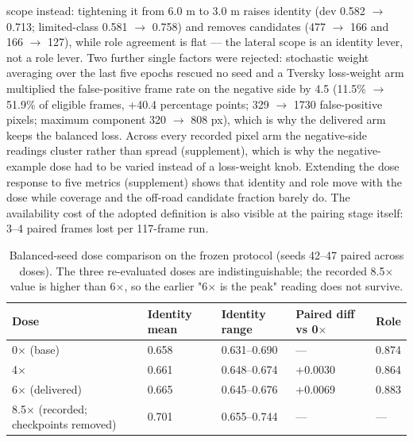 \documentclass[journal]{IEEEtran}
\begin{document}
scope instead: tightening it from 6.0 m to 3.0 m raises identity (dev 0.582 $\rightarrow$ 0.713; limited-class
0.581 $\rightarrow$ 0.758) and removes candidates (477 $\rightarrow$ 166 and 166 $\rightarrow$ 127), while role agreement is flat --- the
lateral scope is an identity lever, not a role lever. Two further single factors were rejected:
stochastic weight averaging \cite{izmailov2018swa} over the last five epochs rescued no seed and a Tversky
loss-weight arm multiplied the false-positive frame rate on the negative side by 4.5 (11.5\% $\rightarrow$ 51.9\% of
eligible frames, +40.4 percentage points; 329 $\rightarrow$ 1730 false-positive pixels; maximum component 320 $\rightarrow$ 808 px),
which is why the delivered arm keeps the balanced loss. Across every recorded pixel arm the negative-side readings cluster rather than spread (supplement), which is why the negative-example dose had to be varied instead of a loss-weight knob. Extending the dose response to five metrics (supplement) shows that identity and role move with the dose while coverage and the off-road candidate fraction barely do. The availability cost of the adopted definition is also visible at the pairing stage itself: 3--4 paired frames lost per 117-frame run.
\begin{table}[!t]
\centering
\caption{Balanced-seed dose comparison on the frozen protocol (seeds 42--47 paired across doses). The three re-evaluated doses are indistinguishable; the recorded 8.5$\times$ value is higher than 6$\times$, so the earlier "6$\times$ is the peak" reading does not survive.}
\begin{tabular}{@{}lllll@{}}
\toprule
Dose & Identity mean & Identity range & Paired diff vs 0$\times$ & Role \\
\midrule
0$\times$ (base) & 0.658 & 0.631--0.690 & --- & 0.874 \\
4$\times$ & 0.661 & 0.648--0.674 & +0.0030 & 0.864 \\
6$\times$ (delivered) & 0.665 & 0.645--0.676 & +0.0069 & 0.883 \\
8.5$\times$ (recorded; checkpoints removed) & 0.701 & 0.655--0.744 & --- & --- \\
\bottomrule
\end{tabular}
\end{table}
\end{document}
